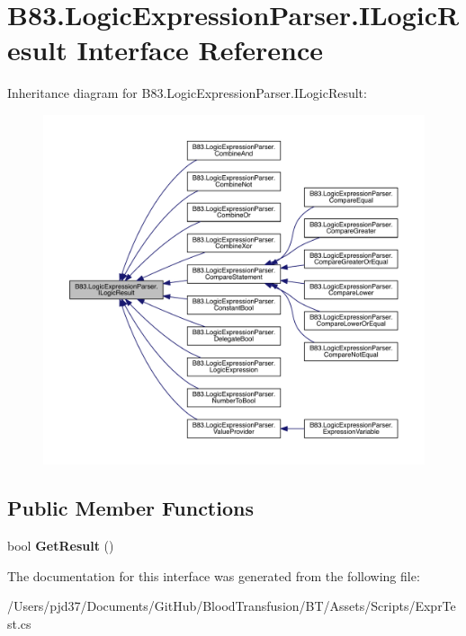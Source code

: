 \hypertarget{interface_b83_1_1_logic_expression_parser_1_1_i_logic_result}{}\section{B83.\+Logic\+Expression\+Parser.\+I\+Logic\+Result Interface Reference}
\label{interface_b83_1_1_logic_expression_parser_1_1_i_logic_result}


Inheritance diagram for B83.\+Logic\+Expression\+Parser.\+I\+Logic\+Result\+:\nopagebreak
\begin{figure}[H]
\begin{center}
\leavevmode
\includegraphics[width=350pt]{interface_b83_1_1_logic_expression_parser_1_1_i_logic_result__inherit__graph}
\end{center}
\end{figure}
\subsection*{Public Member Functions}
\begin{DoxyCompactItemize}
\item 
bool {\bfseries Get\+Result} ()\hypertarget{interface_b83_1_1_logic_expression_parser_1_1_i_logic_result_ac8f593d5cdc049af1c7df7b4c78d824e}{}\label{interface_b83_1_1_logic_expression_parser_1_1_i_logic_result_ac8f593d5cdc049af1c7df7b4c78d824e}

\end{DoxyCompactItemize}


The documentation for this interface was generated from the following file\+:\begin{DoxyCompactItemize}
\item 
/\+Users/pjd37/\+Documents/\+Git\+Hub/\+Blood\+Transfusion/\+B\+T/\+Assets/\+Scripts/Expr\+Test.\+cs\end{DoxyCompactItemize}
